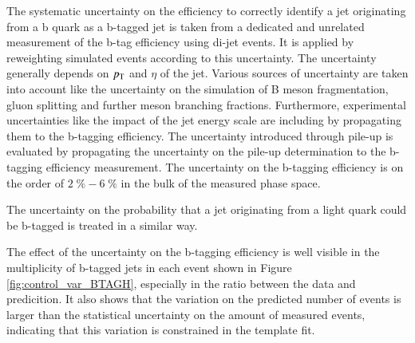 The systematic uncertainty on the efficiency to correctly identify a jet originating from a b quark as a b-tagged jet is taken from a dedicated and unrelated measurement of the b-tag efficiency  using di-jet events. It is applied by reweighting simulated events according to this uncertainty. The uncertainty generally depends on $p_{\mathrm{T}}$ and $\eta$ of the jet.
Various sources of uncertainty are taken into account like the uncertainty on the simulation of B meson fragmentation, gluon splitting and further meson branching fractions.
Furthermore, experimental uncertainties like the impact of the jet energy scale are including by propagating them to the b-tagging efficiency. The uncertainty introduced through pile-up is evaluated by propagating the uncertainty
on the pile-up determination to the b-tagging efficiency measurement.
The uncertainty on the b-tagging efficiency is on the order of $2 \; \% - 6 \; \%$ in the bulk of the measured phase space.

The uncertainty on the probability that a jet originating from a light quark could be b-tagged is treated in a similar way.

The effect of the uncertainty on the b-tagging efficiency is well visible in the multiplicity of b-tagged jets in each event shown in Figure \ref{fig:control_var_BTAGH}, especially in the ratio between the data and predicition.
It also shows that the variation on the predicted number of events is larger than the statistical uncertainty on the amount of measured events, indicating that this variation is constrained in the
template fit.

